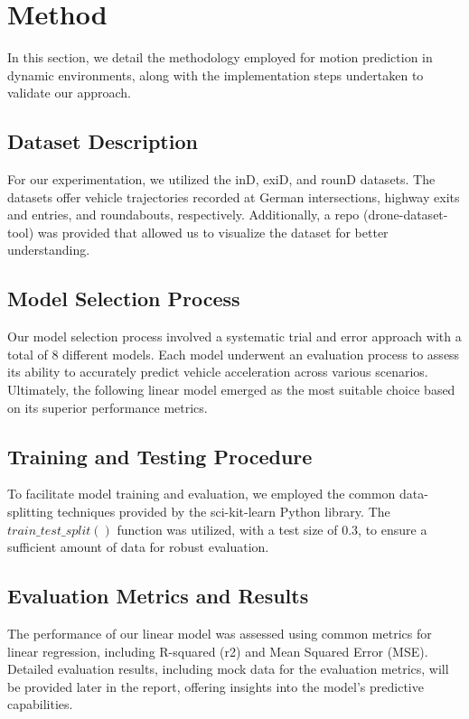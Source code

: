 \section{Method}

In this section, we detail the methodology employed for motion prediction in dynamic environments, 
along with the implementation steps undertaken to validate our approach.

\subsection{Dataset Description} 
For our experimentation, we utilized the inD, exiD, and rounD datasets.
The datasets offer vehicle trajectories recorded at German intersections, highway exits and entries, and roundabouts, respectively. 
Additionally, a repo (drone-dataset-tool) was provided that allowed us to visualize the dataset for better understanding. 


\subsection{Model Selection Process} 
Our model selection process involved a systematic trial and error approach with a total of 8 different models. 
Each model underwent an evaluation process to assess its ability to accurately predict vehicle acceleration across 
various scenarios. 
Ultimately, the following linear model emerged as the most suitable choice based on its superior performance metrics.

\subsection{Training and Testing Procedure} 
To facilitate model training and evaluation, we employed the common data-splitting techniques provided by 
the sci-kit-learn Python library. 
The $train\_test\_split()$ function was utilized, with a test size of 0.3, to ensure a sufficient amount of data 
for robust evaluation.

\subsection{Evaluation Metrics and Results} 
The performance of our linear model was assessed using common metrics for linear regression, including 
R-squared (r2) and Mean Squared Error (MSE). 
Detailed evaluation results, including mock data for the evaluation metrics, will be provided later in the report, 
offering insights into the model's predictive capabilities.

